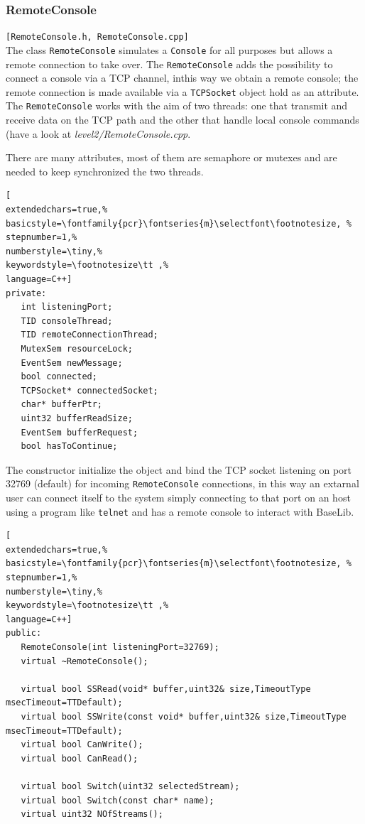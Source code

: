 \subsubsection{RemoteConsole}
\texttt{[RemoteConsole.h, RemoteConsole.cpp]}\\
The class \texttt{RemoteConsole} simulates a \texttt{Console} for all purposes but allows a remote connection to take over. The \texttt{RemoteConsole} adds the possibility to connect a console via a TCP channel, inthis way we obtain a remote console; the remote connection is made available via a \texttt{TCPSocket} object hold as an attribute. \\


The \texttt{RemoteConsole} works with the aim of two threads: one that transmit and receive data on the TCP path and the other that handle local console commands (have a look at \textit{level2/RemoteConsole.cpp}.

There are many attributes, most of them are semaphore or mutexes and are needed to keep synchronized the two threads.
\begin{lstlisting}[
extendedchars=true,%
basicstyle=\fontfamily{pcr}\fontseries{m}\selectfont\footnotesize, %
stepnumber=1,%
numberstyle=\tiny,%
keywordstyle=\footnotesize\tt ,%
language=C++]
private:
   int listeningPort;
   TID consoleThread;
   TID remoteConnectionThread;
   MutexSem resourceLock;
   EventSem newMessage;
   bool connected;
   TCPSocket* connectedSocket;
   char* bufferPtr;
   uint32 bufferReadSize;
   EventSem bufferRequest;
   bool hasToContinue;
\end{lstlisting}

The constructor initialize the object and bind the TCP socket listening on port 32769 (default) for incoming \texttt{RemoteConsole} connections, in this way an extarnal user can connect itself to the system simply connecting to that port on an host using a program like \texttt{telnet} and has a remote console to interact with BaseLib.
\begin{lstlisting}[
extendedchars=true,%
basicstyle=\fontfamily{pcr}\fontseries{m}\selectfont\footnotesize, %
stepnumber=1,%
numberstyle=\tiny,%
keywordstyle=\footnotesize\tt ,%
language=C++]
public:
   RemoteConsole(int listeningPort=32769);
   virtual ~RemoteConsole();

   virtual bool SSRead(void* buffer,uint32& size,TimeoutType msecTimeout=TTDefault);
   virtual bool SSWrite(const void* buffer,uint32& size,TimeoutType msecTimeout=TTDefault);
   virtual bool CanWrite();
   virtual bool CanRead();
   
   virtual bool Switch(uint32 selectedStream);
   virtual bool Switch(const char* name);
   virtual uint32 NOfStreams();
\end{lstlisting}



